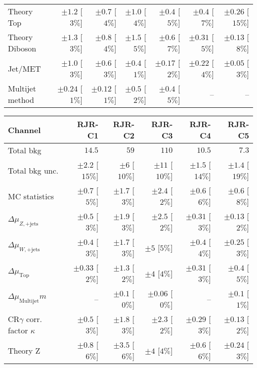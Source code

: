 \begin{table}[hbtp]
\begin{center}
\begin{tabular}{|lrrrrrr|}
Theory Top   &  $\pm 1.2$ [$3\%$]  &  $\pm 0.7$ [$4\%$]  &  $\pm 1.0$ [$4\%$]  &  $\pm 0.4$ [$5\%$]  &  $\pm 0.4$ [$7\%$]  &  $\pm 0.26$ [$15\%$] \\
Theory Diboson  &  $\pm 1.3$ [$3\%$]  &  $\pm 0.8$ [$4\%$]  &  $\pm 1.5$ [$5\%$]  &  $\pm 0.6$ [$7\%$]  &  $\pm 0.31$ [$5\%$]  &  $\pm 0.13$ [$8\%$] \\
Jet/MET   &  $\pm 1.0$ [$3\%$]  &  $\pm 0.6$ [$3\%$]  &  $\pm 0.4$ [$1\%$]  &  $\pm 0.17$ [$2\%$]  &  $\pm 0.22$ [$4\%$]  &  $\pm 0.05$ [$3\%$] \\
Multijet method  &  $\pm 0.24$ [$1\%$]  &  $\pm 0.12$ [$1\%$]  &  $\pm 0.5$ [$2\%$]  &  $\pm 0.4$ [$5\%$]  &   --    &   --   \\
\hline
\end{tabular}

\begin{tabular}{|lrrrrr|}
\hline
Channel                           & \textbf{ RJR-C1 }   & \textbf{ RJR-C2 }  & \textbf{ RJR-C3 }  & \textbf{ RJR-C4 }   & \textbf{ RJR-C5 }   \\ \hline
Total bkg                         & $14.5$              & $59$               & $110$              & $10.5$              & $7.3$               \\
Total bkg unc.                    & $\pm 2.2$  [$15\%$] & $\pm 6$  [$10\%$]  & $\pm 11$  [$10\%$] & $\pm 1.5$  [$14\%$] & $\pm 1.4$  [$19\%$] \\
\hline
MC statistics                     & $\pm 0.7$ [$5\%$]   & $\pm 1.7$ [$3\%$]  & $\pm 2.4$ [$2\%$]  & $\pm 0.6$ [$6\%$]   & $\pm 0.6$ [$8\%$]   \\
$\Delta\mu_{Z,\mathrm{+jets}}$    & $\pm 0.5$ [$3\%$]   & $\pm 1.9$ [$3\%$]  & $\pm 2.5$ [$2\%$]  & $\pm 0.31$ [$3\%$]  & $\pm 0.13$ [$2\%$]  \\
$\Delta\mu_{W,\mathrm{+jets}}$    & $\pm 0.4$ [$3\%$]   & $\pm 1.7$ [$3\%$]  & $\pm 5$ [$5\%$]    & $\pm 0.4$ [$4\%$]   & $\pm 0.25$ [$3\%$]  \\
$\Delta\mu_{\mathrm{ Top}}$       & $\pm 0.33$ [$2\%$]  & $\pm 1.3$ [$2\%$]  & $\pm 4$ [$4\%$]    & $\pm 0.31$ [$3\%$]  & $\pm 0.4$ [$5\%$]   \\
$\Delta\mu_{\mathrm{ Multijet}}m$ & --                  & $\pm 0.1$ [$0\%$]  & $\pm 0.06$ [$0\%$] & --                  & $\pm 0.1$ [$1\%$]   \\
CR$\gamma$ corr. factor $\kappa$  & $\pm 0.5$ [$3\%$]   & $\pm 1.8$ [$3\%$]  & $\pm 2.3$ [$2\%$]  & $\pm 0.29$ [$3\%$]  & $\pm 0.13$ [$2\%$]  \\
Theory Z                          & $\pm 0.8$ [$6\%$]   & $\pm 3.5$ [$6\%$]  & $\pm 4$ [$4\%$]    & $\pm 0.6$ [$6\%$]   & $\pm 0.24$ [$3\%$]  \\

\end{tabular}
\end{center}
\end{table}
